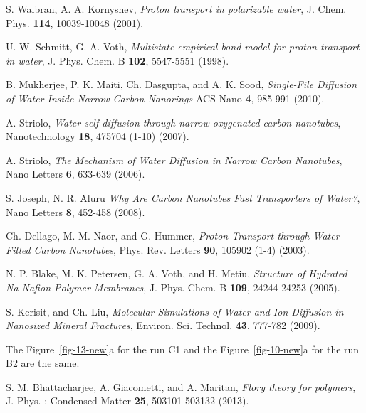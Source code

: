 \documentclass[3p,english,preprint]{elsarticle}
\begin{document}
\begin{thebibliography}{00}
S. Walbran, A. A. Kornyshev,
{\it Proton transport in polarizable water},
J. Chem. Phys. {\bf 114},  10039-10048 (2001).




U. W. Schmitt, G. A. Voth, 
{\it Multistate empirical bond model for proton transport in water},
J. Phys. Chem. B {\bf 102}, 5547-5551  (1998).




B. Mukherjee, P.  K. Maiti, Ch. Dasgupta, and A. K. Sood, 
{\it Single-File Diffusion of Water Inside Narrow Carbon Nanorings}
ACS Nano {\bf  4},  985-991 (2010).



A. Striolo, 
{\it Water self-diffusion through narrow oxygenated carbon nanotubes}, 
Nanotechnology {\bf 18}, 475704 (1-10) (2007).


A. Striolo, 
{\it The Mechanism of Water Diffusion in Narrow Carbon Nanotubes},
Nano Letters {\bf 6},  633-639  (2006). 


S. Joseph, N. R. Aluru
{\it Why Are Carbon Nanotubes Fast Transporters of Water?},
Nano Letters {\bf 8}, 452-458 (2008).



 Ch.  Dellago,  M.  M. Naor, and G.  Hummer, 
{\it Proton Transport through Water-Filled Carbon Nanotubes}, 
Phys. Rev. Letters {\bf 90},  105902 (1-4)   (2003).


N. P. Blake, M. K. Petersen, G. A. Voth, and H. Metiu, 
{\it Structure of Hydrated Na-Nafion Polymer Membranes},
J. Phys. Chem. B {\bf 109}, 24244-24253 (2005).






S.  Kerisit, and Ch.  Liu, 
{\it Molecular Simulations of Water and Ion Diffusion in Nanosized Mineral Fractures},
Environ. Sci. Technol. {\bf 43}, 777-782 (2009).



The  Figure~\ref{fig-13-new}a for the run C1 and 
the  Figure~\ref{fig-10-new}a for the run B2 
are the same. 


S.  M.  Bhattacharjee, A. Giacometti,  and A.  Maritan,
{\it Flory theory for polymers},
J. Phys. : Condensed Matter {\bf 25}, 503101-503132 (2013).




\end{thebibliography}
\end{document}
